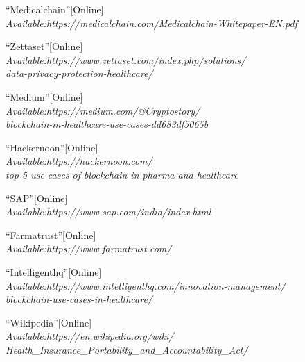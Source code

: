 \documentclass[12pt]{report}
\begin{document}
\begin{thebibliography}{100}
 \textquotedblleft Medicalchain\textquotedblright[Online]\\ 
\textit{Available:https://medicalchain.com/Medicalchain-Whitepaper-EN.pdf}

 \textquotedblleft Zettaset\textquotedblright[Online]\\ 
\textit{Available:https://www.zettaset.com/index.php/solutions/\\data-privacy-protection-healthcare/}

 \textquotedblleft Medium\textquotedblright[Online]\\ 
\textit{Available:https://medium.com/@Cryptostory/\\blockchain-in-healthcare-use-cases-dd683df5065b}


 \textquotedblleft Hackernoon\textquotedblright[Online]\\ 
\textit{Available:https://hackernoon.com/\\top-5-use-cases-of-blockchain-in-pharma-and-healthcare}

 \textquotedblleft SAP\textquotedblright[Online]\\ 
\textit{Available:https://www.sap.com/india/index.html}

 \textquotedblleft Farmatrust\textquotedblright[Online]\\ 
\textit{Available:https://www.farmatrust.com/}

 \textquotedblleft Intelligenthq\textquotedblright[Online]\\ 
\textit{Available:https://www.intelligenthq.com/innovation-management/\\blockchain-use-cases-in-healthcare/}

 \textquotedblleft Wikipedia\textquotedblright[Online]\\ 
\textit{Available:https://en.wikipedia.org/wiki/\\Health\_Insurance\_Portability\_and\_Accountability\_Act/}


\vspace{2cm}

\end{thebibliography}
\end{document}
